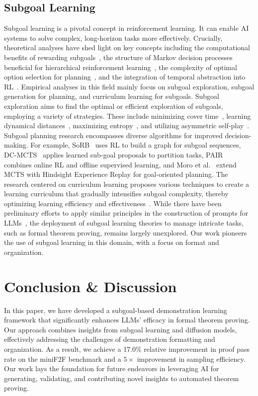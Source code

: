\documentclass{article}
\begin{document}
\subsection{Subgoal Learning}
Subgoal learning is a pivotal concept in reinforcement learning. It can enable AI systems to solve complex, long-horizon tasks more effectively. Crucially, theoretical analyses have shed light on key concepts including the computational benefits of rewarding subgoals~\cite{zhai2022computational}, the structure of Markov decision processes beneficial for hierarchical reinforcement learning~\cite{wen2020efficiency}, the complexity of optimal option selection for planning~\cite{jinnai2019finding}, and the integration of temporal abstraction into RL~\cite{fruit2017regret}. Empirical analyses in this field mainly focus on subgoal exploration, subgoal generation for planning, and curriculum learning for subgoals. Subgoal exploration aims to find the optimal or efficient exploration of subgoals, employing a variety of strategies. These include minimizing cover time~\cite{jinnai2019discovering}, learning dynamical distances~\cite{hartikainen2019dynamical}, maximizing entropy~\cite{pitis2020maximum}, and utilizing asymmetric self-play~\cite{openai2021asymmetric}. Subgoal planning research encompasses diverse algorithms for improved decision-making. For example, SoRB~\cite{eysenbach2019search} uses RL to build a graph for subgoal sequences, DC-MCTS~\cite{parascandolo2020divide} applies learned sub-goal proposals to partition tasks, PAIR~\cite{li2022phasic} combines online RL and offline supervised learning, and Moro et al.~\cite{moro2022goal} extend MCTS with Hindsight Experience Replay for goal-oriented planning. The research centered on curriculum learning proposes various techniques to create a learning curriculum that gradually intensifies subgoal complexity, thereby optimizing learning efficiency and effectiveness~\cite{zhang2020automatic, zhang2021c}. While there have been preliminary efforts to apply similar principles in the construction of prompts for LLMs~\cite{khot2022decomposed}, the deployment of subgoal learning theories to manage intricate tasks, such as formal theorem proving, remains largely unexplored. Our work pioneers the use of subgoal learning in this domain, with a focus on format and organization.


\section{Conclusion \& Discussion}
In this paper, we have developed a subgoal-based demonstration learning framework that significantly enhances LLMs' efficacy in formal theorem proving. Our approach combines insights from subgoal learning and diffusion models, effectively addressing the challenges of demonstration formatting and organization. As a result, we achieve a 17.0\% relative improvement in proof pass rate on the miniF2F benchmark and a $5\times$ improvement in sampling efficiency. Our work lays the foundation for future endeavors in leveraging AI for generating, validating, and contributing novel insights to automated theorem proving.
\end{document}
